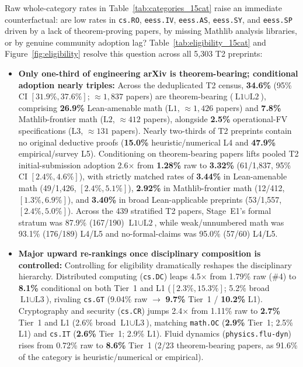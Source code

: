 \documentclass[11pt,letterpaper]{article}
\begin{document}
Raw whole-category rates in Table~\ref{tab:categories_15cat} raise an immediate counterfactual: are low rates in \texttt{cs.RO}, \texttt{eess.IV}, \texttt{eess.AS}, \texttt{eess.SY}, and \texttt{eess.SP} driven by a lack of theorem-proving papers, by missing Mathlib analysis libraries, or by genuine community adoption lag? Table~\ref{tab:eligibility_15cat} and Figure~\ref{fig:eligibility} resolve this question across all 5,303 T2 preprints:
\begin{itemize}
  \item \textbf{Only one-third of engineering arXiv is theorem-bearing; conditional adoption nearly triples:} Across the deduplicated T2 census, \textbf{34.6\%} (95\% CI $[31.9\%, 37.6\%]$; $\approx 1{,}837$ papers) are theorem-bearing ($\text{L1} \cup \text{L2}$), comprising \textbf{26.9\%} Lean-amenable math ($\text{L1}$, $\approx 1{,}426$ papers) and \textbf{7.8\%} Mathlib-frontier math ($\text{L2}$, $\approx 412$ papers), alongside \textbf{2.5\%} operational-FV specifications ($\text{L3}$, $\approx 131$ papers). Nearly two-thirds of T2 preprints contain no original deductive proofs (\textbf{15.0\%} heuristic/numerical L4 and \textbf{47.9\%} empirical/survey L5). Conditioning on theorem-bearing papers lifts pooled T2 initial-submission adoption 2.6$\times$ from \textbf{1.28\%} raw to \textbf{3.32\%} (61/1,837, 95\% CI $[2.4\%, 4.6\%]$), with strictly matched rates of \textbf{3.44\%} in Lean-amenable math (49/1,426, $[2.4\%, 5.1\%]$), \textbf{2.92\%} in Mathlib-frontier math (12/412, $[1.3\%, 6.9\%]$), and \textbf{3.40\%} in broad Lean-applicable preprints (53/1,557, $[2.4\%, 5.0\%]$). Across the 439 stratified T2 papers, Stage~E1's formal stratum was 87.9\% (167/190) $\text{L1} \cup \text{L2}$, while weak/unnumbered math was 93.1\% (176/189) L4/L5 and no-formal-claims was 95.0\% (57/60) L4/L5.
  \item \textbf{Major upward re-rankings once disciplinary composition is controlled:} Controlling for eligibility dramatically reshapes the disciplinary hierarchy. Distributed computing (\texttt{cs.DC}) leaps 4.5$\times$ from 1.79\% raw (\#4) to \textbf{8.1\%} conditional on both Tier~1 and L1 ($[2.3\%, 15.3\%]$; 5.2\% broad $\text{L1} \cup \text{L3}$), rivaling \texttt{cs.GT} (9.04\% raw $\to$ \textbf{9.7\%} Tier~1 / \textbf{10.2\%} L1). Cryptography and security (\texttt{cs.CR}) jumps 2.4$\times$ from 1.11\% raw to \textbf{2.7\%} Tier~1 and L1 (2.6\% broad $\text{L1} \cup \text{L3}$), matching \texttt{math.OC} (\textbf{2.9\%} Tier~1; 2.5\% L1) and \texttt{cs.IT} (\textbf{2.6\%} Tier~1; 2.9\% L1). Fluid dynamics (\texttt{physics.flu-dyn}) rises from 0.72\% raw to \textbf{8.6\%} Tier~1 (2/23 theorem-bearing papers, as 91.6\% of the category is heuristic/numerical or empirical).

\end{itemize}
\end{document}
